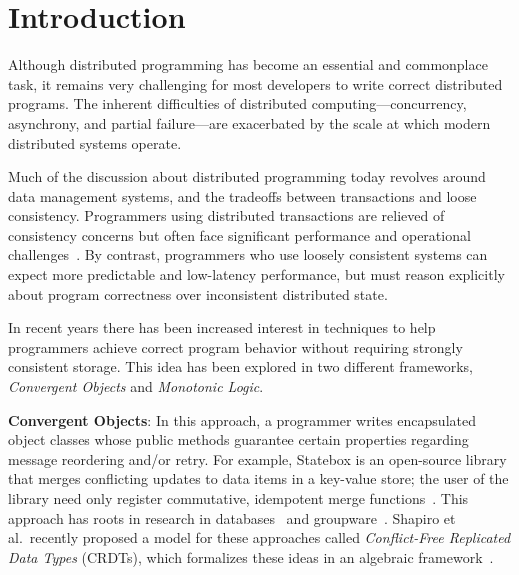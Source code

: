 \section{Introduction} 
\label{sec:intro} 
Although distributed programming has become an essential and commonplace task,
it remains very challenging for most developers to write correct distributed
programs. The inherent difficulties of distributed computing---concurrency,
asynchrony, and partial failure---are exacerbated by the scale at which modern
distributed systems operate.

Much of the discussion about distributed programming today revolves around data
management systems, and the tradeoffs between transactions and loose
consistency. Programmers using distributed transactions are relieved of
consistency concerns but often face significant performance and operational
challenges~\cite{Birman2009}. By contrast, programmers who use loosely
consistent systems can expect more predictable and low-latency performance, but
must reason explicitly about program correctness over inconsistent distributed
state.

In recent years there has been increased interest in techniques to help
programmers achieve correct program behavior without requiring strongly
consistent storage. This idea has been explored in two different frameworks,
\emph{Convergent Objects} and \emph{Monotonic Logic}.

\vspace{0.5em}\noindent
\textbf{Convergent Objects}: In this approach, a programmer writes encapsulated
object classes whose public methods guarantee certain properties regarding
message reordering and/or retry. For example, Statebox is an open-source library
that merges conflicting updates to data items in a key-value store; the user of
the library need only register commutative, idempotent merge
functions~\cite{statebox}. This approach has roots in research in
databases~\cite{Farrag1989,Garcia-Molina1983,Helland2009} and
groupware~\cite{Ellis1989,Sun1998}.  Shapiro et al.\ recently proposed a model
for these approaches called \emph{Conflict-Free Replicated Data Types} (CRDTs),
which formalizes these ideas in an algebraic framework~\cite{Shapiro2011b}.

